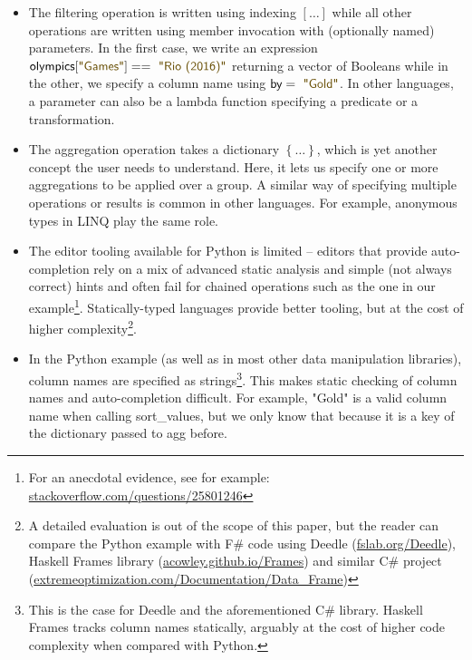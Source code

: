 \documentclass[a4paper,UKenglish]{lipics-v2016}
\theoremstyle{plain}
\theoremstyle{definition}
\newcommand{\str}[1]{\textnormal{\textcolor{strclr}{\sffamily "#1"}}}
\newcommand{\ident}[1]{\textnormal{\sffamily #1}}
\begin{document}
\begin{itemize}
\item The filtering operation is written using indexing $[\ldots]$ while all other operations are
  written using member invocation with (optionally named) parameters. In the first case, we write
  an expression $\ident{olympics}[\str{Games}]==\str{Rio (2016)}$ returning a vector of Booleans
  while in the other, we specify a column name using $\ident{by}=\str{Gold}$. In other languages,
  a parameter can also be a lambda function specifying a predicate or a transformation.
  
\item The aggregation operation takes a dictionary $\left\{\ldots\right\}$, which is yet another
  concept the user needs to understand. Here, it lets us specify one or more aggregations to
  be applied over a group. A similar way of specifying multiple operations or results is common 
  in other languages. For example, anonymous types in LINQ \cite{linq} play the same role.
      
\item The editor tooling available for Python is limited -- editors that provide auto-completion
  rely on a mix of advanced static analysis and simple (not always correct) hints and often fail
  for chained operations such as the one in our example\footnote{For an anecdotal evidence,
  see for example: \url{stackoverflow.com/questions/25801246}}. Statically-typed languages
  provide better tooling, but at the cost of higher complexity\footnote{A detailed evaluation 
  is out of the scope of this paper, but the reader can compare the Python example with 
  F\# code using Deedle (\url{fslab.org/Deedle}), Haskell Frames library (\url{acowley.github.io/Frames})
  and similar C\# project (\url{extremeoptimization.com/Documentation/Data_Frame})}.

\item In the Python example (as well as in most other data manipulation libraries), column names are 
  specified as strings\footnote{This is the case for Deedle and the aforementioned C\# library. 
  Haskell Frames \cite{frames} tracks column names statically, arguably at the cost of higher code 
  complexity when compared with Python.}. This makes static checking of column names and auto-completion 
  difficult. For example, \str{Gold} is a valid column name when calling \ident{sort\_values}, but 
  we only know that because it is a key of the dictionary passed to \ident{agg} before.
\end{itemize}
\end{document}
